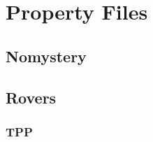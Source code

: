\documentclass[12pt]{article}
\begin{document}
\newpage
\section{Property Files}

\subsection*{Nomystery}



\subsection*{Rovers}


\FloatBarrier
\subsubsection*{TPP}


\end{document}
